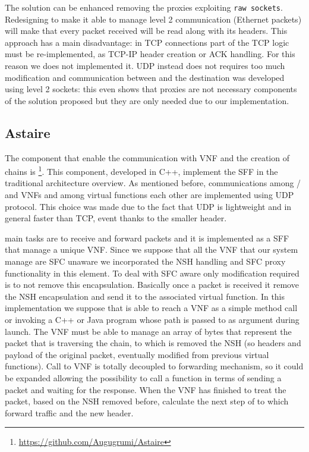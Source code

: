 The solution can be enhanced removing the proxies exploiting
\texttt{raw sockets}. Redesigning \ironhide{} to make it able to manage level 2
communication (Ethernet packets) will make that every packet received will
be read along with its headers. This approach has a main disadvantage: in TCP
connections part of the TCP logic must be re-implemented, as TCP-IP header
creation or ACK handling. For this reason we does not implemented it. UDP
instead does not requires too much modification and communication between 
\egress{} and the destination was developed using level 2 sockets: this even
shows that proxies are not necessary components of the solution proposed but
they are only needed due to our implementation.

\subsection{Astaire}
The component that enable the communication with VNF and the creation of chains
is \astaire{}\footnote{\url{https://github.com/Augugrumi/Astaire}}. This
component, developed in C++, implement the SFF in the traditional architecture
overview. As mentioned before, communications among \ingresses{}/\egresses{}
and VNFs and among virtual functions each other are implemented using UDP
protocol. This choice was made due to the fact that UDP is lightweight and in
general faster than TCP, event thanks to the smaller header. 

\astaire{} main tasks are to receive and forward packets and it is implemented
as a SFF that manage a unique VNF. Since we suppose that all the VNF that our
system manage are SFC unaware we incorporated the NSH handling and SFC proxy
functionality in this element. To deal with SFC aware only modification required
is to not remove this encapsulation. Basically once a packet is received it
remove the NSH encapsulation and send it to the associated virtual function. In
this implementation we suppose that \astaire{} is able to reach a VNF as a
simple method call or invoking a C++ or Java program whose path is passed to 
\astaire{} as argument during launch. The VNF must be able to manage an array of
bytes that represent the packet that is traversing the chain, to which is
removed the NSH (so headers and payload of the original packet, eventually
modified from previous virtual functions). Call to VNF is totally decoupled
to forwarding mechanism, so it could be expanded allowing the possibility to
call a function in terms of sending a packet and waiting for the response. When
the VNF has finished to treat the packet, based on the NSH removed before,
calculate the next step of to which forward traffic and the new header. 

